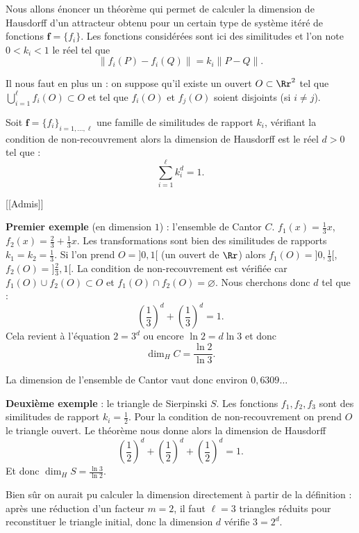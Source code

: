 \documentclass[11pt,class=report,crop=false]{standalone}
\begin{document}
Nous allons énoncer un théorème qui permet de calculer la dimension de Hausdorff
d'un attracteur obtenu pour un certain type de système itéré de fonctions $\mathbf{f}=\{f_i\}$.
Les fonctions considérées sont ici des similitudes et l'on note $0<k_i<1$
le réel tel que
$$\|f_i(P)-f_i(Q)\| = k_i \|P-Q\|.$$

Il nous faut en plus un  : on suppose qu'il existe un ouvert
$O \subset \Rr^2$ tel que $\bigcup_{i=1}^{\ell} f_i(O) \subset O$ et 
tel que $f_i(O)$ et $f_j(O)$ soient disjoints (si $i\neq j$).

\begin{theoreme}
Soit $\mathbf{f}=\{f_i\}_{i=1,\ldots,\ell}$ une famille de similitudes de rapport $k_i$,
vérifiant la condition de non-recouvrement alors la dimension de Hausdorff
est le réel $d>0$ tel que :
$$\sum_{i=1}^\ell k_i^d =1.$$
\end{theoreme}

[[Admis]]

\bigskip

\textbf{Premier exemple} (en dimension $1$) : l'ensemble de Cantor $C$. $f_1(x)=\frac 13x$, 
$f_2(x)=\frac 23 + \frac 13x$.
Les transformations sont
bien des similitudes de rapports $k_1=k_2=\frac13$.
Si l'on prend $O=]0,1[$ (un ouvert de $\Rr$) alors $f_1(O) = ]0,\frac 13[$, 
$f_2(O)=]\frac 23,1[$. 
La condition de non-recouvrement est vérifiée car $f_1(O)\cup f_2(O) \subset O$
et $f_1(O)\cap f_2(O)=\varnothing$.
Nous cherchons donc $d$ tel que :
$$\left(\frac 13 \right)^d + \left(\frac 13 \right)^d =1.$$
Cela revient à l'équation $2= 3^d$ ou encore
$\ln 2 = d \ln 3$ et donc 
$$\dim_H C = \frac{\ln 2}{\ln 3}.$$

La dimension de l'ensemble de Cantor vaut donc environ $0,6309\ldots$


\bigskip

\textbf{Deuxième exemple} : le triangle de Sierpinski $S$.
Les fonctions $f_1, f_2, f_3$ sont des similitudes de rapport
$k_i=\frac 12$. Pour la condition de non-recouvrement on prend $O$
le triangle ouvert. Le théorème nous donne alors la dimension de Hausdorff
$$\left(\frac 12 \right)^d + \left(\frac 12 \right)^d+\left(\frac 12 \right)^d = 1.$$
Et donc $\dim_H S = \frac{\ln 3}{\ln 2}.$

Bien sûr on aurait pu calculer la dimension directement à partir de la définition : après une réduction d'un facteur
$m=2$, il faut $\ell=3$ triangles réduits pour reconstituer le triangle initial, donc la dimension $d$ vérifie $3=2^d$.
\end{document}
